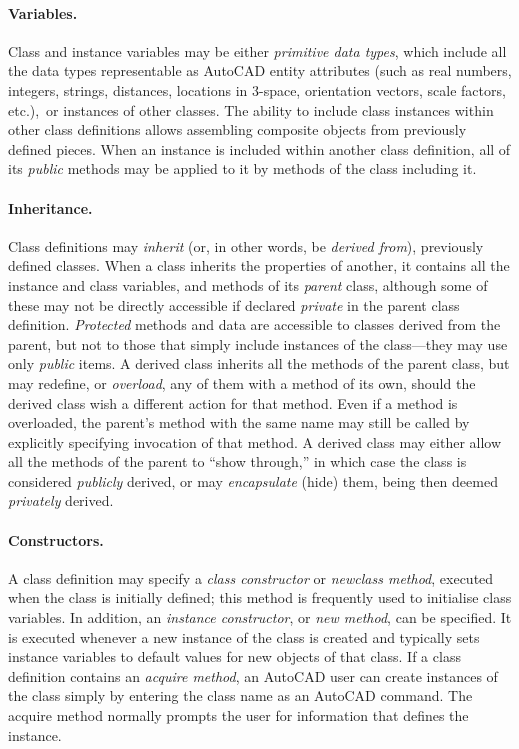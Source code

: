 \documentclass{article}
\begin{document}
\paragraph{Variables.}
Class and instance variables may be either {\em primitive data types},
which include all the data types representable as AutoCAD entity
attributes (such as real numbers, integers, strings, distances,
locations in 3-space, orientation vectors, scale factors, etc.),\ or
instances of other classes.  The ability to include class instances
within other class definitions allows assembling composite objects
from previously defined pieces.  When an instance is included within
another class definition, all of its {\em public} methods may be
applied to it by methods of the class including it.

\paragraph{Inheritance.}
Class definitions may {\em inherit} (or, in other words, be {\em
derived from}), previously defined classes.  When a class inherits
the properties of another, it contains all the instance and class
variables, and methods of its {\em parent} class, although some of
these may not be directly accessible if declared {\em private} in the
parent class definition.  {\em Protected} methods and data are
accessible to classes derived from the parent, but not to those that
simply include instances of the class---they may use only {\em public}
items.  A derived class inherits all the methods of the parent class,
but may redefine, or {\em overload}, any of them with a method of its
own, should the derived class wish a different action for that method.
Even if a method is overloaded, the parent's method with the same name
may still be called by explicitly specifying invocation of that method.
A derived class may either allow all the methods of the parent to
``show through,'' in which case the class is considered {\em
publicly} derived, or may {\em encapsulate} (hide) them, being then
deemed {\em privately} derived.

\paragraph{Constructors.}
A class definition may specify a {\em class constructor} or {\em
newclass method}, executed when the class is initially
defined; this method is frequently used to initialise class variables.
In addition, an {\em instance constructor}, or {\em new method}, can be
specified.  It is executed whenever a new instance of the class is
created and typically sets instance variables to default values for
new objects of that class.  If a class definition contains an {\em
acquire method}, an AutoCAD user can create instances of the class
simply by entering the class name as an AutoCAD command.  The acquire
method normally prompts the user for information that defines the
instance.
\end{document}
